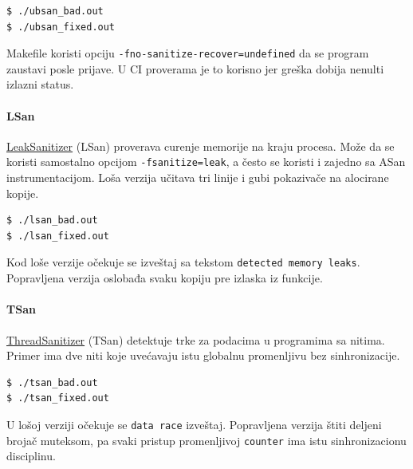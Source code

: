 

\begin{verbatim}
$ ./ubsan_bad.out
$ ./ubsan_fixed.out
\end{verbatim}

Makefile koristi opciju \texttt{-fno-sanitize-recover=undefined} da se program zaustavi posle prijave. U CI proverama je to korisno jer greška dobija nenulti izlazni status.

\paragraph{LSan}\label{leaksanitizer}

\href{https://clang.llvm.org/docs/LeakSanitizer.html}{LeakSanitizer} (LSan) proverava curenje memorije na kraju procesa. Može da se koristi samostalno opcijom \texttt{-fsanitize=leak}, a često se koristi i zajedno sa ASan instrumentacijom. Loša verzija učitava tri linije i gubi pokazivače na alocirane kopije.



\begin{verbatim}
$ ./lsan_bad.out
$ ./lsan_fixed.out
\end{verbatim}

Kod loše verzije očekuje se izveštaj sa tekstom \texttt{detected memory leaks}. Popravljena verzija oslobađa svaku kopiju pre izlaska iz funkcije.

\paragraph{TSan}\label{threadsanitizer}

\href{https://clang.llvm.org/docs/ThreadSanitizer.html}{ThreadSanitizer} (TSan) detektuje trke za podacima u programima sa nitima. Primer ima dve niti koje uvećavaju istu globalnu promenljivu bez sinhronizacije.



\begin{verbatim}
$ ./tsan_bad.out
$ ./tsan_fixed.out
\end{verbatim}

U lošoj verziji očekuje se \texttt{data race} izveštaj. Popravljena verzija štiti deljeni brojač muteksom, pa svaki pristup promenljivoj \texttt{counter} ima istu sinhronizacionu disciplinu.

